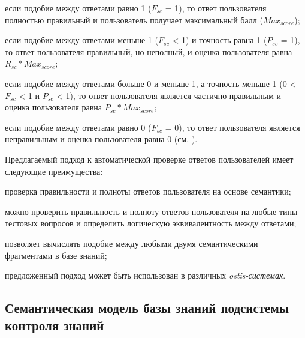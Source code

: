 \begin{textitemize}
	\item если подобие между ответами равно 1 ($F_{sc}$ = 1), то ответ пользователя полностью правильный и пользователь получает максимальный балл ($Max_{score}$);
	
	\item если подобие между ответами меньше 1 ($F_{sc}$ < 1) и точность равна 1 ($P_{sc}$ = 1), то ответ пользователя правильный, но неполный, и оценка пользователя равна $R_{sc}*Max_{score}$;
	
	\item если подобие между ответами больше 0 и меньше 1, а точность меньше 1 (0 < $F_{sc}$ < 1 и $P_{sc}$ < 1), то ответ пользователя является частично правильным и оценка пользователя равна $P_{sc}*Max_{score}$;
	
	\item если подобие между ответами равно 0 ($F_{sc}$ = 0), то ответ пользователя является неправильным и оценка пользователя равна 0 (см. ).
\end{textitemize}

Предлагаемый подход к автоматической проверке ответов пользователей имеет следующие преимущества:

\begin{textitemize}
	\item проверка правильности и полноты ответов пользователя на основе семантики;
	
	\item можно проверить правильность и полноту ответов пользователя на любые типы тестовых вопросов и определить логическую эквивалентность между ответами;
	
	\item позволяет вычислять подобие между любыми двумя семантическими фрагментами в базе знаний;
	
	\item предложенный подход может быть использован в различных \textit{ostis-системах}.
\end{textitemize}

\subsection{Семантическая модель базы знаний подсистемы контроля знаний}
\label{subsec_semantic_model_KB_knowledge_control_subsystem}


